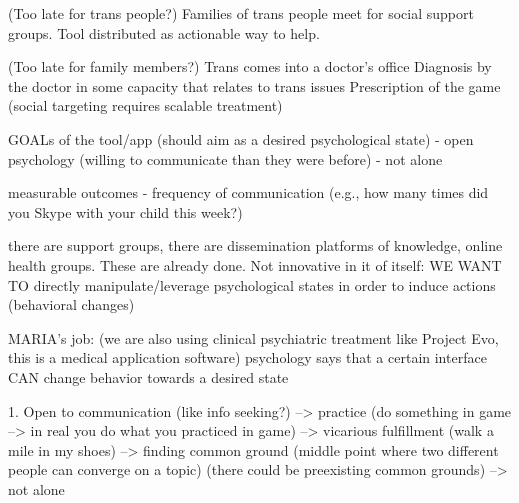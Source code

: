 
(Too late for trans people?)
Families of trans people meet for social support groups. 
Tool distributed as actionable way to help. 

(Too late for family members?)
Trans comes into a doctor's office
Diagnosis by the doctor in some capacity that relates to trans issues
Prescription of the game (social targeting requires scalable treatment)

GOALs of the tool/app (should aim as a desired psychological state)
- open psychology (willing to communicate than they were before)
- not alone

measurable outcomes
- frequency of communication (e.g., how many times did you Skype with your child this week?)


there are support groups, there are dissemination platforms of knowledge, online health groups. These are already done. Not innovative in it of itself:
WE WANT TO directly manipulate/leverage psychological states in order to induce actions
(behavioral changes)

MARIA's job: (we are also using clinical psychiatric treatment like Project Evo, this is a medical application software)
psychology says that a certain interface CAN change behavior towards a desired state

1. Open to communication (like info seeking?)
--> practice (do something in game --> in real you do what you practiced in game)
--> vicarious fulfillment (walk a mile in my shoes)
--> finding common ground (middle point where two different people can converge on a topic) (there could be preexisting common grounds)
--> not alone 


